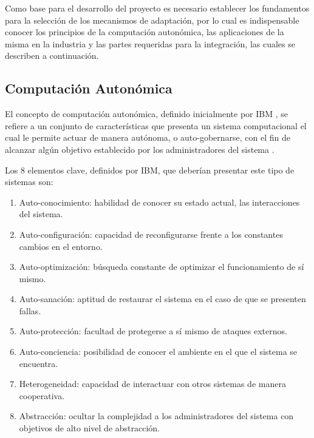 \documentclass[12pt]{article}
\begin{document}
    Como base para el desarrollo del proyecto es necesario establecer los fundamentos para la selección de los mecanismos de adaptación, por lo cual es indispensable conocer los principios de la computación autonómica, las aplicaciones de la misma en la industria y las partes requeridas para la integración, las cuales se describen a continuación.

    \subsection{Computación Autonómica}
    

    El concepto de computación autonómica, definido inicialmente por IBM \citeyear{horn_2001}, se refiere a un conjunto de características que presenta un sistema computacional el cual le permite actuar de manera autónoma, o auto-gobernarse, con el fin de alcanzar algún objetivo establecido por los administradores del sistema \cite{lalanda_diaconescu_mccann_2014}.


    Los 8 elementos clave, definidos por IBM, que deberían presentar este tipo de sistemas son:
    \begin{enumerate}
        \item Auto-conocimiento: habilidad de conocer su estado actual, las interacciones del sistema.
        \item Auto-configuración: capacidad de reconfigurarse frente a los constantes cambios en el entorno.
        \item Auto-optimización: búsqueda constante de optimizar el funcionamiento de sí mismo.
        \item Auto-sanación: aptitud de restaurar el sistema en el caso de que se presenten fallas.
        \item Auto-protección: facultad de protegerse a sí mismo de ataques externos.
        \item Auto-conciencia: posibilidad de conocer el ambiente en el que el sistema se encuentra.
        \item Heterogeneidad: capacidad de interactuar con otros sistemas de manera cooperativa.
        \item Abstracción: ocultar la complejidad a los administradores del sistema con objetivos de alto nivel de abstracción.
    \end{enumerate}
\end{document}
